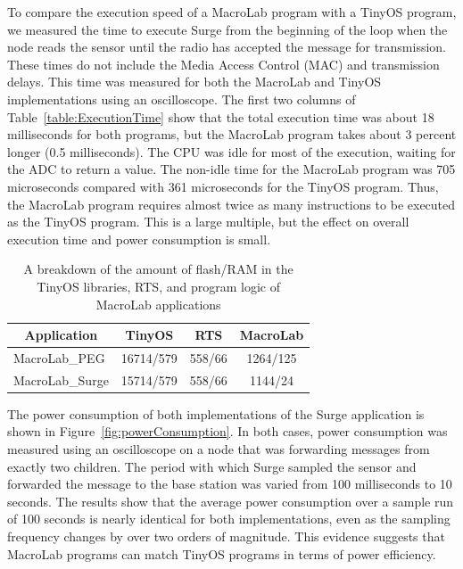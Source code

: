 To compare the execution speed of a MacroLab program with a TinyOS program, we
measured the time to execute Surge from the beginning of the loop when the node
reads the sensor until the radio has accepted the message for transmission.
These times do not include the Media Access Control (MAC) and transmission
delays.  This time was measured for both the MacroLab and TinyOS implementations
using an oscilloscope.  The first two columns of Table~\ref{table:ExecutionTime}
show that the total execution time was about 18 milliseconds for both programs,
but the MacroLab program takes about 3 percent longer (0.5 milliseconds).  The
CPU was idle for most of the execution, waiting for the ADC to return a value.
The non-idle time for the MacroLab program was 705 microseconds compared with
361 microseconds for the TinyOS program.  Thus, the MacroLab program requires
almost twice as many instructions to be executed as the TinyOS program.  This is
a large multiple, but the effect on overall execution time and power consumption
is small.

\begin{table}
  \centering
  \begin{minipage}{\columnwidth}
    \centering
    \begin{tabular}{|l|c|c|c|}
      \hline
      \multicolumn{1}{|c}{Application} & \multicolumn{1}{|c|}{TinyOS} & \multicolumn{1}{c|}{RTS} & \multicolumn{1}{c|}{MacroLab}\\
      \hline
      MacroLab\_PEG&16714/579&558/66&1264/125\\
      MacroLab\_Surge&15714/579&558/66&1144/24\\
      \hline
    \end{tabular}
  \end{minipage}
  \smallskip
  \caption[MacroLab memory usage]{A breakdown of the amount of flash/RAM in the
    TinyOS libraries, RTS, and program logic of MacroLab applications}
  \label{table:CodeBreakdown}
\end{table}

The power consumption of both implementations of the Surge application is shown
in Figure~\ref{fig:powerConsumption}.  In both cases, power consumption was
measured using an oscilloscope on a node that was forwarding messages from
exactly two children.  The period with which Surge sampled the sensor and
forwarded the message to the base station was varied from 100 milliseconds to 10
seconds. The results show that the average power consumption over a sample run
of 100 seconds is nearly identical for both implementations, even as the
sampling frequency changes by over two orders of magnitude.  This evidence
suggests that MacroLab programs can match TinyOS programs in terms of power
efficiency.

